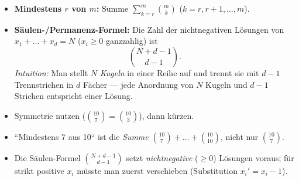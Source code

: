 \begin{werkzeugkasten}
\begin{itemize}
  \item \textbf{Mindestens $r$ von $m$:} Summe
        $\sum_{k=r}^{m}\binom{m}{k}$ ($k=r,r+1,\dots,m$).
  \item \textbf{Säulen-/Permanenz-Formel:} Die Zahl der nichtnegativen
        Lösungen von $x_1+\dots+x_d=N$ ($x_i\ge0$ ganzzahlig) ist
        \begin{equation}
          \binom{N+d-1}{d-1}.
        \end{equation}
        \emph{Intuition:} Man stellt $N$ \emph{Kugeln} in einer Reihe auf
        und trennt sie mit $d-1$ Trennstrichen in $d$ Fächer --- jede
        Anordnung von $N$ Kugeln und $d-1$ Strichen entspricht einer
        Lösung.
\end{itemize}
\end{werkzeugkasten}

\begin{achtung}
\begin{itemize}
  \item Symmetrie nutzen ($\binom{10}{7}=\binom{10}{3}$), dann kürzen.
  \item ``Mindestens 7 aus 10`` ist die \emph{Summe}
        $\binom{10}{7}+\dots+\binom{10}{10}$, nicht nur
        $\binom{10}{7}$.
  \item Die Säulen-Formel $\binom{N+d-1}{d-1}$ setzt \emph{nichtnegative}
        ($\ge0$) Lösungen voraus; für strikt positive $x_i$ müsste man
        zuerst verschieben (Substitution $x_i'=x_i-1$).
\end{itemize}
\end{achtung}
